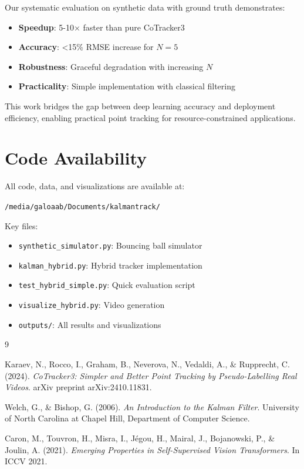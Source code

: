 \documentclass[11pt]{article}
\begin{document}
Our systematic evaluation on synthetic data with ground truth demonstrates:
\begin{itemize}
    \item \textbf{Speedup}: 5-10× faster than pure CoTracker3
    \item \textbf{Accuracy}: <15\% RMSE increase for $N=5$
    \item \textbf{Robustness}: Graceful degradation with increasing $N$
    \item \textbf{Practicality}: Simple implementation with classical filtering
\end{itemize}

This work bridges the gap between deep learning accuracy and deployment efficiency, enabling practical point tracking for resource-constrained applications.

\section*{Code Availability}

All code, data, and visualizations are available at:
\begin{center}
\texttt{/media/galoaab/Documents/kalmantrack/}
\end{center}

Key files:
\begin{itemize}
    \item \texttt{synthetic\_simulator.py}: Bouncing ball simulator
    \item \texttt{kalman\_hybrid.py}: Hybrid tracker implementation
    \item \texttt{test\_hybrid\_simple.py}: Quick evaluation script
    \item \texttt{visualize\_hybrid.py}: Video generation
    \item \texttt{outputs/}: All results and visualizations
\end{itemize}

\begin{thebibliography}{9}

Karaev, N., Rocco, I., Graham, B., Neverova, N., Vedaldi, A., \& Rupprecht, C. (2024).
\textit{CoTracker3: Simpler and Better Point Tracking by Pseudo-Labelling Real Videos}.
arXiv preprint arXiv:2410.11831.

Welch, G., \& Bishop, G. (2006).
\textit{An Introduction to the Kalman Filter}.
University of North Carolina at Chapel Hill, Department of Computer Science.

Caron, M., Touvron, H., Misra, I., Jégou, H., Mairal, J., Bojanowski, P., \& Joulin, A. (2021).
\textit{Emerging Properties in Self-Supervised Vision Transformers}.
In ICCV 2021.

\end{thebibliography}
\end{document}
